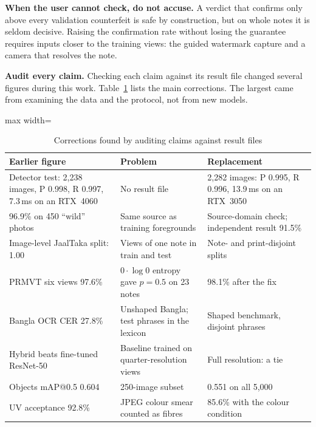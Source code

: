 \documentclass[preprint,12pt]{elsarticle}
\begin{document}
\textbf{When the user cannot check, do not accuse.} A verdict that confirms only above every validation counterfeit is safe by construction, but on whole notes it is seldom decisive. Raising the confirmation rate without losing the guarantee requires inputs closer to the training views: the guided watermark capture and a camera that resolves the note.

\textbf{Audit every claim.} Checking each claim against its result file changed several figures during this work. Table~\ref{tab:corr} lists the main corrections. The largest came from examining the data and the protocol, not from new models.

\begin{table}[!htbp]
\caption{Corrections found by auditing claims against result files}
\label{tab:corr}
\centering\footnotesize
\begin{adjustbox}{max width=\textwidth}\begin{tabular}{@{}p{4.6cm}p{4.2cm}p{4.6cm}@{}}
\toprule
Earlier figure & Problem & Replacement \\ \midrule
Detector test: 2,238 images, P 0.998, R 0.997, 7.3\,ms on an RTX~4060 & No result file & 2,282 images: P 0.995, R 0.996, 13.9\,ms on an RTX~3050 \\
96.9\% on 450 ``wild'' photos & Same source as training foregrounds & Source-domain check; independent result 91.5\% \\
Image-level JaalTaka split: 1.00 & Views of one note in train and test & Note- and print-disjoint splits \\
PRMVT six views 97.6\% & $0\cdot\log0$ entropy gave $p=0.5$ on 23 notes & 98.1\% after the fix \\
Bangla OCR CER 27.8\% & Unshaped Bangla; test phrases in the lexicon & Shaped benchmark, disjoint phrases \\
Hybrid beats fine-tuned ResNet-50 & Baseline trained on quarter-resolution views & Full resolution: a tie \\
Objects mAP@0.5 0.604 & 250-image subset & 0.551 on all 5,000 \\
UV acceptance 92.8\% & JPEG colour smear counted as fibres & 85.6\% with the colour condition \\ \bottomrule
\end{tabular}\end{adjustbox}
\end{table}

\end{document}
